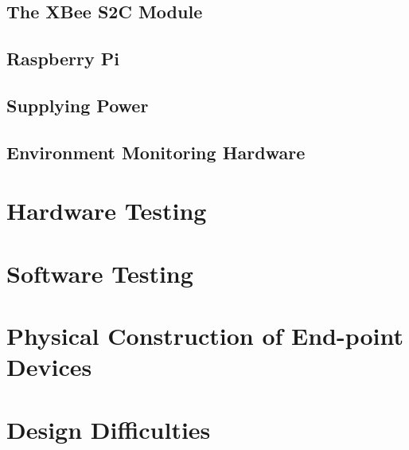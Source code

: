 \documentclass[letter,twocolumn]{report}
\begin{document}
		\subsection{The XBee S2C Module}
			
		\subsection{Raspberry Pi}
			
		\subsection{Supplying Power}
			
	
	\subsection{Environment Monitoring Hardware}
		
	
	\section{Hardware Testing}
		

	\section{Software Testing}
		
	
	\section{Physical Construction of End-point Devices}
		
		
	\section{Design Difficulties}
		
		
	\onecolumn
\end{document}

